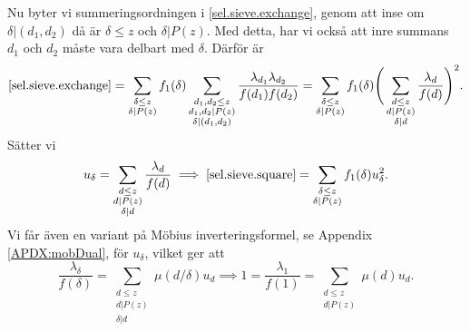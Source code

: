 Nu byter vi summeringsordningen i \eqref{sel.sieve.exchange}, genom att inse om \(\delta|(d_1,d_2)\) då är \(\delta \leq z\) och \(\delta | P(z)\).
Med detta, har vi också att inre summans \(d_1\) och \(d_2\) måste vara delbart med \(\delta\). Därför är
\begin{equation}
    \eqref{sel.sieve.exchange} = \sum_{\substack{\delta \leq z\\ \delta | P(z)}}f_1(\delta) \sum_{\substack{d_1,d_2\leq z\\d_1,d_2|P(z)\\\delta|(d_1,d_2)}}\frac{\lambda_{d_1}\lambda_{d_2}}{f(d_1)f(d_2)} = \sum_{\substack{\delta \leq z\\ \delta | P(z)}}f_1(\delta)\Bigg(\sum_{\substack{d\leq z\\d|P(z)\\\delta|d}}\frac{\lambda_d}{f(d)}\Bigg)^2.\label{sel.sieve.square}
\end{equation}
Sätter vi 
\begin{equation}
u_\delta = \sum_{\substack{d\leq z \\ d|P(z) \\ \delta | d}} \frac{\lambda_d}{f(d)} \implies \eqref{sel.sieve.square} = \sum_{\substack{\delta \leq z\\ \delta | P(z)}}f_1(\delta) u_\delta^2\label{sel.sieve.uuu}.
\end{equation}
Vi får även en variant på Möbius inverteringsformel, se Appendix \ref{APDX:mobDual}, för \(u_\delta\), vilket ger att
\begin{equation}
    \frac{\lambda_\delta}{f(\delta)} = \sum_{\substack{d\leq z\\d|P(z)\\\delta|d}} \mu(d/\delta)u_d \implies 1 = \frac{\lambda_1}{f(1)} = \sum_{\substack{d\leq z\\ d|P(z)}}\mu(d)u_d.\label{sel.sieve.one}
\end{equation}

